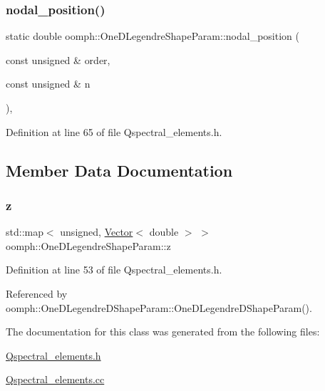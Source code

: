 \subsubsection{\texorpdfstring{nodal\+\_\+position()}{nodal\_position()}}
{\footnotesize\ttfamily static double oomph\+::\+One\+D\+Legendre\+Shape\+Param\+::nodal\+\_\+position (\begin{DoxyParamCaption}\item[{const unsigned \&}]{order,  }\item[{const unsigned \&}]{n }\end{DoxyParamCaption})\hspace{0.3cm}{\ttfamily [inline]}, {\ttfamily [static]}}



Definition at line 65 of file Qspectral\+\_\+elements.\+h.



\subsection{Member Data Documentation}
\mbox{\label{classoomph_1_1OneDLegendreShapeParam_a74cb7131a47cc15dc79d25af12a13950}} 
\subsubsection{\texorpdfstring{z}{z}}
{\footnotesize\ttfamily std\+::map$<$ unsigned, \hyperlink{classoomph_1_1Vector}{Vector}$<$ double $>$ $>$ oomph\+::\+One\+D\+Legendre\+Shape\+Param\+::z\hspace{0.3cm}{\ttfamily [static]}}



Definition at line 53 of file Qspectral\+\_\+elements.\+h.



Referenced by oomph\+::\+One\+D\+Legendre\+D\+Shape\+Param\+::\+One\+D\+Legendre\+D\+Shape\+Param().



The documentation for this class was generated from the following files\+:\begin{DoxyCompactItemize}
\item 
\hyperlink{Qspectral__elements_8h}{Qspectral\+\_\+elements.\+h}\item 
\hyperlink{Qspectral__elements_8cc}{Qspectral\+\_\+elements.\+cc}\end{DoxyCompactItemize}
